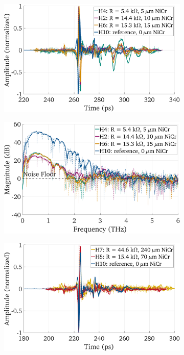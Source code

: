 \begin{figure}[!]
    \centering
    \begin{subfigure}[b]{0.49\textwidth}
        \centering
        \includegraphics[height=0.6\textwidth]{figures/Results/mainTextComp/H10_H4_H2_H6/H10_H4_H2_H6_MA_time_normed.pdf}
        \caption{\centering}
        \label{comp_h10_h4_h2_h6_time}
    \end{subfigure}
    \hfill
    \begin{subfigure}[b]{0.49\textwidth}
        \centering
        \includegraphics[height=0.6\textwidth]{figures/Results/mainTextComp/H10_H4_H2_H6/H10_H4_H2_H6_spectrum_nn.pdf}
        \caption{\centering}
        \label{comp_h10_h4_h2_h6_spectum}
    \end{subfigure}
    \hfill
    \centering
    \begin{subfigure}[b]{0.49\textwidth}
        \centering
        \includegraphics[height=0.6\textwidth]{figures/Results/mainTextComp/H10_H8_H7/H10_H8_H7_MA_time_norm.pdf}

\end{subfigure}
\end{figure}
